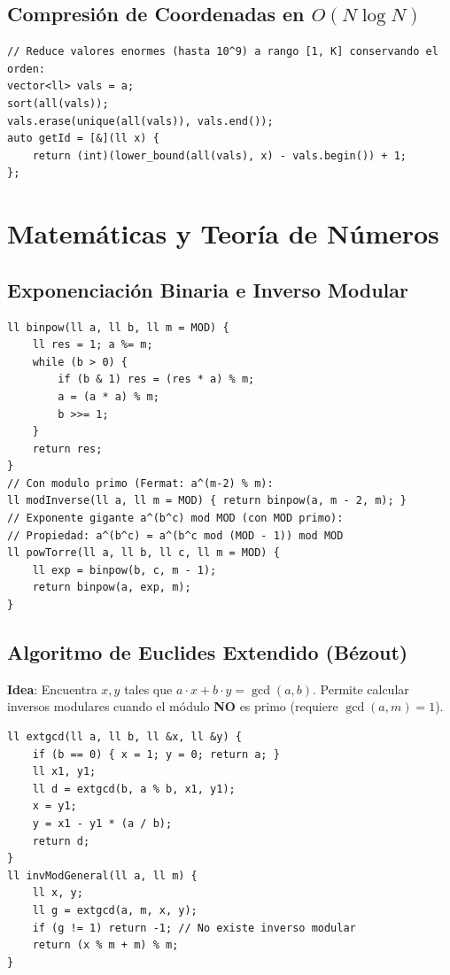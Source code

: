 \documentclass[9pt,twocolumn,a4paper]{extarticle}
\begin{document}
\subsection{Compresión de Coordenadas en $O(N \log N)$}
\begin{lstlisting}
// Reduce valores enormes (hasta 10^9) a rango [1, K] conservando el orden:
vector<ll> vals = a;
sort(all(vals));
vals.erase(unique(all(vals)), vals.end());
auto getId = [&](ll x) {
    return (int)(lower_bound(all(vals), x) - vals.begin()) + 1;
};
\end{lstlisting}

\section{Matemáticas y Teoría de Números}
\subsection{Exponenciación Binaria e Inverso Modular}
\begin{lstlisting}
ll binpow(ll a, ll b, ll m = MOD) {
    ll res = 1; a %= m;
    while (b > 0) {
        if (b & 1) res = (res * a) % m;
        a = (a * a) % m;
        b >>= 1;
    }
    return res;
}
// Con modulo primo (Fermat: a^(m-2) % m):
ll modInverse(ll a, ll m = MOD) { return binpow(a, m - 2, m); }
// Exponente gigante a^(b^c) mod MOD (con MOD primo):
// Propiedad: a^(b^c) = a^(b^c mod (MOD - 1)) mod MOD
ll powTorre(ll a, ll b, ll c, ll m = MOD) {
    ll exp = binpow(b, c, m - 1);
    return binpow(a, exp, m);
}
\end{lstlisting}

\subsection{Algoritmo de Euclides Extendido (Bézout)}
\textbf{Idea}: Encuentra $x, y$ tales que $a \cdot x + b \cdot y = \gcd(a, b)$. Permite calcular inversos modulares cuando el módulo \textbf{NO} es primo (requiere $\gcd(a, m) = 1$).
\begin{lstlisting}
ll extgcd(ll a, ll b, ll &x, ll &y) {
    if (b == 0) { x = 1; y = 0; return a; }
    ll x1, y1;
    ll d = extgcd(b, a % b, x1, y1);
    x = y1;
    y = x1 - y1 * (a / b);
    return d;
}
ll invModGeneral(ll a, ll m) {
    ll x, y;
    ll g = extgcd(a, m, x, y);
    if (g != 1) return -1; // No existe inverso modular
    return (x % m + m) % m;
}
\end{lstlisting}
\end{document}
